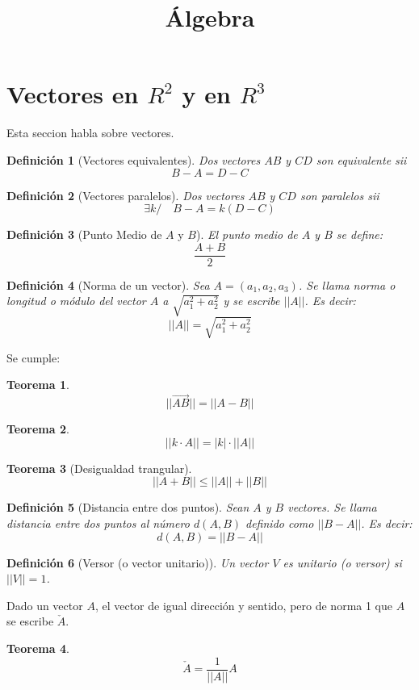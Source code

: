 \documentclass[12pt,a4paper]{extarticle}
\title{\'Algebra}
\newtheorem{teo}{Teorema}[section]
\newtheorem{mydef}{Definici\'on}[section]
\begin{document}
\maketitle
\section{Vectores en \(R^2\) y en \(R^3\)}
Esta seccion habla sobre vectores.
\begin{mydef}[Vectores equivalentes]
  Dos vectores \(AB\) y \(CD\) son \emph{equivalente} sii 
  \[ B - A = D - C \]
\end{mydef}

\begin{mydef}[Vectores paralelos]
  Dos vectores \(AB\) y \(CD\) son paralelos sii
  \[\exists k / \quad B - A = k(D-C)\]
\end{mydef}

\begin{mydef}[Punto Medio de \(A\) y \(B\)]
  El punto medio de \(A\) y \(B\) se define:
  \[\frac{A+B}{2}\]
\end{mydef}

\begin{mydef}[Norma de un vector]
  Sea \(A = (a_1, a_2, a_3)\). Se llama \emph{norma} o \emph{longitud} o
  \emph{m\'odulo} del vector \(A\) a \(\sqrt{a_1^2 + a_2^2}\) y se
  escribe \(||A||\). Es decir:
  \[||A|| = \sqrt{a_1^2 + a_2^2}\]
\end{mydef}
Se cumple:
\begin{teo}
  \[||\overrightarrow{AB}|| = || A-B ||\]
\end{teo}
\begin{teo}
  \[||k \cdot A|| = |k| \cdot ||A||\]
\end{teo}

\begin{teo}[Desigualdad trangular]
  \[||A+B|| \leq ||A|| + ||B||\]
\end{teo}
\begin{mydef}[Distancia entre dos puntos]
  Sean \(A\) y \(B\) vectores. Se llama \emph{distancia entre dos
    puntos} al n\'umero \(d(A,B)\) definido como \(||B-A||\). Es decir:
  \[d(A,B) = ||B-A||\]
\end{mydef}

\begin{mydef}[Versor (o vector unitario)]
  Un vector \(V\) es unitario (o versor) si \(||V||=1\).
\end{mydef}
Dado un vector \(A\), el vector de igual direcci\'on y sentido, pero de
norma 1 que \(A\) se escribe \(\check{A}\).
\begin{teo}
  \[\check{A}=\frac{1}{||A||} A\]
\end{teo}
\end{document}
